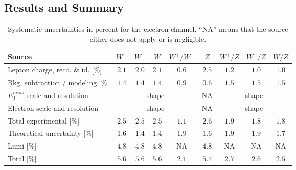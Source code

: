 \subsection{Results and Summary}

\begin{table}[htbp]
\centering
\small
\begin {tabular}  {lcccccccc}
Source & $W^+$ & $W^-$ & $W$ & $W^+/W^-$ & $Z$ & $W^+/Z$ & $W^-/Z$ & $W/Z$ \\
\hline
Lepton charge, reco. \& id. [\%] & $2.1$ & $2.0$ & $2.1$ & $0.6$ & $2.5$ & $1.2$ & $1.0$ & $1.0$ \\
Bkg. subtraction / modeling [\%] & $1.4$ & $1.4$ & $1.4$ & $0.9$ & $0.6$ & $1.5$ & $1.5$ & $1.5$ \\ 
$E_{T}^{miss}$ scale and resolution  & \multicolumn{4}{c}{shape}  & NA & \multicolumn{3}{c}{shape}  \\ 
Electron scale and resolution & \multicolumn{4}{c}{shape}  & NA & \multicolumn{3}{c}{shape}  \\ 
\hline
Total experimental [\%] & $2.5$ & $2.5$ & $2.5$ & $1.1$ & $2.6$ & $1.9$ & $1.8$ & $1.8$ \\
\hline
Theoretical uncertainty [\%] & $1.6$ & $1.4$ & $1.4$ & $1.9$ & $1.6$ & $1.9$ & $1.9$ & $1.7$ \\
\hline
Lumi [\%] & $4.8$ & $4.8$ & $4.8$ & NA & $4.8$ & NA & NA & NA \\
\hline
Total [\%] & $5.6$ & $5.6$ & $5.6$ & $2.1$ & $5.7$ & $2.7$ & $2.6$ & $2.5$ \\
\end {tabular} 
\caption[.]{ \label{tab:syst_el}
Systematic uncertainties in percent for the electron channel. ``NA'' means that the source either does not apply or is negligible.}
\end{table}


